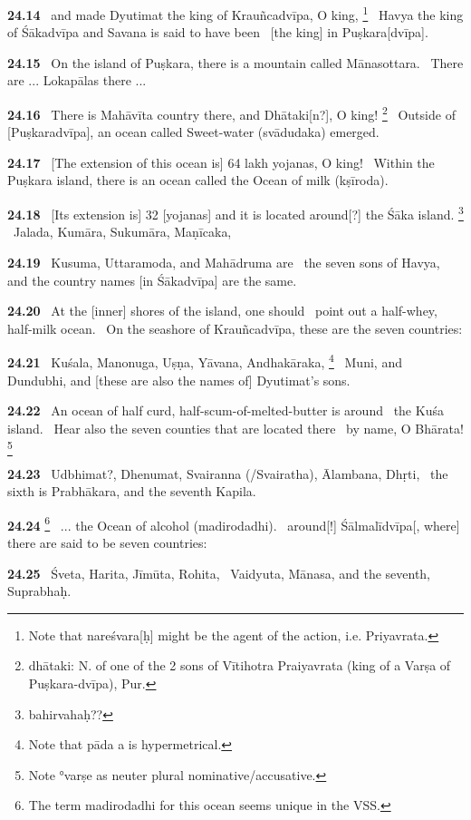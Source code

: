 \documentclass{article}
\begin{document}
\textbf{24.14}%
\ and made Dyutimat the king of Krauñcadvīpa, O king,%
\footnote{Note that nareśvara[ḥ] might be the agent of the action, i.e. Priyavrata. }%
\ Havya the king of Śākadvīpa and Savana is said to have been%
\                                 [the king] in Puṣkara[dvīpa].%


\textbf{24.15}%
\ On the island of Puṣkara, there is a mountain called Mānasottara.%
\ There are ... Lokapālas there ...%


\textbf{24.16}%
\ There is Mahāvīta country there, and Dhātaki[n?], O king!%
\footnote{dhātaki: N. of one of the 2 sons of Vītihotra Praiyavrata (king of a Varṣa of Puṣkara-dvīpa), Pur. }%
\ Outside of [Puṣkaradvīpa], an ocean called Sweet-water (svādudaka) emerged.%


\textbf{24.17}%
\ [The extension of this ocean is] 64 lakh yojanas, O king!%
\ Within the Puṣkara island, there is an ocean called the Ocean of milk (kṣīroda).%


\textbf{24.18}%
\ [Its extension is] 32 [yojanas] and it is located around[?] the Śāka island.%
\footnote{bahirvahaḥ??  }%
\ Jalada, Kumāra, Sukumāra, Maṇīcaka,%


\textbf{24.19}%
\ Kusuma, Uttaramoda, and Mahādruma are%
\ the seven sons of Havya, and the country names [in Śākadvīpa] are the same.%


\textbf{24.20}%
\ At the [inner] shores of the island, one should%
\                         point out a half-whey, half-milk ocean.%
\ On the seashore of Krauñcadvīpa, these are the seven countries:%


\textbf{24.21}%
\ Kuśala, Manonuga, Uṣṇa, Yāvana, Andhakāraka,%
\footnote{Note that pāda a is hypermetrical. }%
\ Muni, and Dundubhi, and [these are also the names of] Dyutimat's sons.%


\textbf{24.22}%
\ An ocean of half curd, half-scum-of-melted-butter is around%
\                 the Kuśa island.%
\ Hear also the seven counties that are located there%
\              by name, O Bhārata!%
\footnote{Note °varṣe as neuter plural nominative/accusative. }%


\textbf{24.23}%
\ Udbhimat?, Dhenumat, Svairanna (/Svairatha), Ālambana, Dhṛti,%
\ the sixth is Prabhākara, and the seventh Kapila.%


\textbf{24.24}%
\footnote{The term madirodadhi for this ocean seems unique in the VSS. }%
\ ... the Ocean of alcohol (madirodadhi).%
\ around[!] Śālmalīdvīpa[, where] there are said to be seven countries:%


\textbf{24.25}%
\ Śveta, Harita, Jīmūta, Rohita,%
\ Vaidyuta, Mānasa, and the seventh, Suprabhaḥ.%
\end{document}
